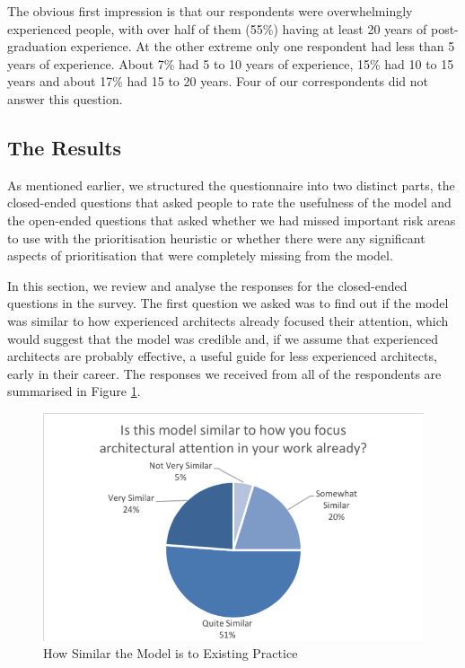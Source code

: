 The obvious first impression is that our respondents were overwhelmingly experienced people, with over half of them (55\%) having at least 20 years of post-graduation experience.  At the other extreme only one respondent had less than 5 years of experience.  About 7\% had 5 to 10 years of experience, 15\% had 10 to 15 years and about 17\% had 15 to 20 years.  Four of our correspondents did not answer this question.

\subsection{The Results}

As mentioned earlier, we structured the questionnaire into two distinct parts, the closed-ended questions that asked people to rate the usefulness of the model and the open-ended questions that asked whether we had missed important risk areas to use with the prioritisation heuristic or whether there were any significant aspects of prioritisation that were completely missing from the model.

In this section, we review and analyse the responses for the closed-ended questions in the survey.
The first question we asked was to find out if the model was similar to how experienced architects already focused their attention, which would suggest that the model was credible and, if we assume that experienced architects are probably effective, a useful guide for less experienced architects, early in their career.  The responses we received from all of the respondents are summarised in Figure \ref{figure:similarity}.
 
\begin{figure}
\centering
\includegraphics[width=12cm,trim={2 2 2 2},clip]{Figures/prioritisation-similarity}
\caption{How Similar the Model is to Existing Practice}
\label{figure:similarity}
\end{figure}

